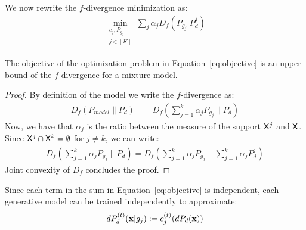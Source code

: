 \documentclass{article}
\newcommand{\Pd}{P_{d}}
\newcommand{\Pm}{P_{model}}
\begin{document}
We now rewrite the $f$-divergence minimization as:
\begin{align}\label{eq:objective}
\min_{\substack{c_j,P_{g_j} \\ j \in [K]}} \sum_j \alpha_j D_f(P_{g_j}| \Pd^j)
\end{align}
\begin{lemma}
The objective of the optimization problem in Equation~\eqref{eq:objective} is an upper bound of the $f$-divergence for a mixture model.
\end{lemma}
\begin{proof}
By definition of the model we write the $f$-divergence as:
\begin{align*}
D_f(\Pm\|\Pd) &= D_f(\sum_{j=1}^k\alpha_jP_{g_j}\|\Pd)
\end{align*}
Now, we have that $\alpha_j$ is the ratio between the measure of the support $\mathsf{X}^j$ and $\mathsf{X}$. Since $\mathsf{X}^j\cap \mathsf{X}^k = \emptyset$ for $j\neq k$, we can write:
\begin{align*}
D_f(\sum_{j=1}^k\alpha_jP_{g_j}\|\Pd) = D_f(\sum_{j=1}^k\alpha_jP_{g_j}\|\sum_{j=1}^k\alpha_j\Pd^j)
\end{align*}
 Joint convexity of $D_f$ concludes the proof.
\end{proof}


Since each term in the sum in Equation~\eqref{eq:objective} is independent, each generative model can be trained independently to approximate: 
\begin{align*}
d\Pd^{(t)}(\bx | g_j) := c_{j}^{(t)}(d\Pd(\bx))
\end{align*}
\end{document}

